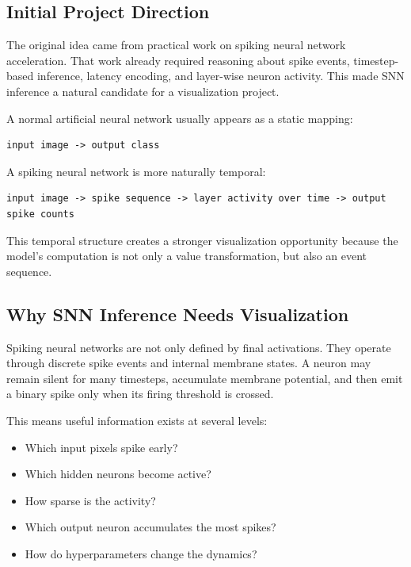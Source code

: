 \documentclass[11pt,a4paper]{article}
\begin{document}
\subsection{Initial Project Direction}

The original idea came from practical work on spiking neural network acceleration. That work already required reasoning about spike events, timestep-based inference, latency encoding, and layer-wise neuron activity. This made SNN inference a natural candidate for a visualization project.

A normal artificial neural network usually appears as a static mapping:

\begin{lstlisting}
input image -> output class
\end{lstlisting}

A spiking neural network is more naturally temporal:

\begin{lstlisting}
input image -> spike sequence -> layer activity over time -> output spike counts
\end{lstlisting}

This temporal structure creates a stronger visualization opportunity because the model's computation is not only a value transformation, but also an event sequence.

\subsection{Why SNN Inference Needs Visualization}

Spiking neural networks are not only defined by final activations. They operate through discrete spike events and internal membrane states. A neuron may remain silent for many timesteps, accumulate membrane potential, and then emit a binary spike only when its firing threshold is crossed.

This means useful information exists at several levels:

\begin{itemize}
    \item Which input pixels spike early?
    \item Which hidden neurons become active?
    \item How sparse is the activity?
    \item Which output neuron accumulates the most spikes?
    \item How do hyperparameters change the dynamics?
\end{itemize}
\end{document}
